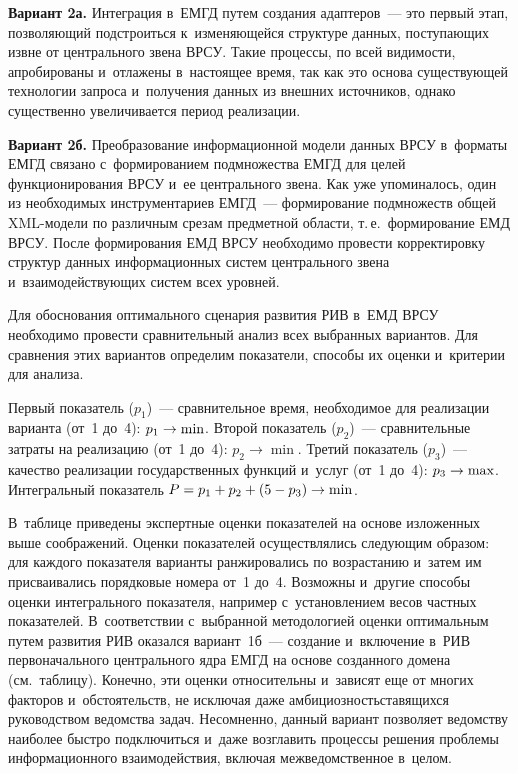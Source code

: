 \begin{multicols}{2}
\textbf{Вариант 2а.} Интеграция в~ЕМГД путем создания адаптеров~--- это 
первый этап, поз\-во\-ля\-ющий подстроиться к~из\-ме\-ня\-ющей\-ся структуре 
данных, по\-сту\-па\-ющих из\-вне от цент\-раль\-но\-го звена ВРСУ. Такие процессы, 
по всей ви\-ди\-мости, апробированы и~отлажены в~на\-сто\-ящее время, так как это 
основа су\-щест\-ву\-ющей технологии запроса и~получения данных из внеш\-них 
источников, однако существенно увеличивается период реализации. 

\textbf{Вариант 2б.} Преобразование информационной модели данных 
\mbox{ВРСУ} в~форматы \mbox{ЕМГД} связано с~формированием подмножества \mbox{ЕМГД} 
для целей функционирования ВРСУ и~ее цент\-раль\-но\-го звена. Как уже 
упоминалось, один из необходимых инструментариев ЕМГД~--- 
формирование подмножеств общей XML-мо\-де\-ли по различным срезам 
предметной об\-ласти, т.\,е.\ формирование ЕМД \mbox{ВРСУ}. После формирования 
ЕМД \mbox{ВРСУ} необходимо провести корректировку структур данных 
информационных сис\-тем цент\-раль\-но\-го звена и~вза\-и\-мо\-дей\-ст\-ву\-ющих сис\-тем 
всех уровней. 



Для обоснования оптимального сценария развития РИВ в~ЕМД \mbox{ВРСУ} 
необходимо провести сравнительный анализ всех выбранных вариантов. Для 
срав\-не\-ния этих вариантов определим показатели, способы их оцен\-ки 
и~критерии для анализа. 

Первый показатель ($p_1$)~--- сравнительное время, необходимое для 
реализации варианта (от~1 до~4): $p_1 \hm\rightarrow \min$. Второй показатель 
($p_2$)~--- сравнительные за\-тра\-ты на реализацию (от~1 до~4): $p_2 
\rightarrow \min$. Третий показатель ($p_3$)~--- качество реализации 
государственных функций и~услуг (от~1 до~4): $p_3 \hm\rightarrow \max$. 
Интегральный показатель $P \hm= p_1 \hm+p_2 \hm+(5\hm- p_3) \hm\rightarrow \min$.

В~таблице приведены экспертные оценки показателей на основе изложенных 
выше соображений. Оценки показателей осуществлялись сле\-ду\-ющим 
образом: для каж\-до\-го показателя варианты ранжировались по возрастанию 
и~затем им присваивались порядковые номера от~1 до~4. Возможны 
и~другие способы оцен\-ки интегрального показателя, например 
с~уста\-нов\-ле\-ни\-ем весов част\-ных показателей. В~соответствии с~выбранной 
методологией оценки оптимальным путем развития РИВ оказался 
вариант~1б~--- создание и~вклю\-че\-ние в~РИВ первоначального цент\-раль\-но\-го 
ядра \mbox{ЕМГД} на основе созданного домена (см.\ таб\-ли\-цу). Конечно, эти оцен\-ки 
относительны и~зависят еще от многих факторов и~обстоятельств, не 
исключая даже ам\-би\-ци\-оз\-ность\linebreak ставящихся руководством ведомства задач. 
Не\-сом\-нен\-но, данный вариант позволяет ведомству наиболее быст\-ро 
подключиться и~даже возглавить процессы решения проб\-ле\-мы 
информационного \mbox{взаимодействия}, вклю\-чая межведомственное в~целом.




\end{multicols}
